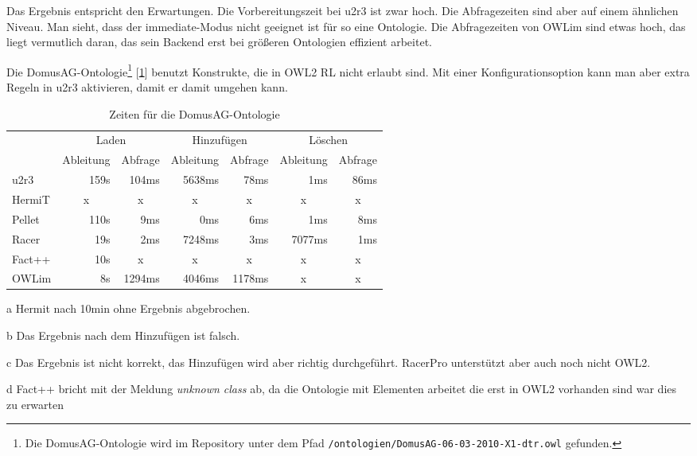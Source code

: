 Das Ergebnis entspricht den Erwartungen. Die Vorbereitungszeit bei u2r3 ist zwar hoch. Die Abfragezeiten sind aber auf einem ähnlichen Niveau.
Man sieht, dass der immediate-Modus nicht geeignet ist für so eine Ontologie. Die Abfragezeiten von OWLim sind etwas hoch, das liegt vermutlich daran, das sein Backend erst bei größeren Ontologien effizient arbeitet.

Die DomusAG-Ontologie\footnote{Die DomusAG-Ontologie wird im Repository unter dem Pfad \texttt{/ontologien/DomusAG-06-03-2010-X1-dtr.owl} gefunden.} [\ref{table-time-domusag}] benutzt Konstrukte, die in OWL2 RL nicht erlaubt sind. Mit einer Konfigurationsoption kann man aber extra Regeln in u2r3 aktivieren, damit er damit umgehen kann.
\begin{table}[htbp]
\caption{Zeiten für die DomusAG-Ontologie}
\label{table-time-domusag}
\begin{center}
\begin{threeparttable}
\begin{tabular}{l|r|r|r|r|r|r|}
\cline{2-7}
 & \multicolumn{2}{|c|}{Laden} & \multicolumn{2}{|c|}{Hinzufügen} & \multicolumn{2}{|c|}{Löschen} \\
\cline{2-7}
 & \multicolumn{1}{|c|}{Ableitung} & \multicolumn{1}{|c|}{Abfrage} & \multicolumn{1}{|c|}{Ableitung} & \multicolumn{1}{|c|}{Abfrage} & \multicolumn{1}{|c|}{Ableitung} & \multicolumn{1}{|c|}{Abfrage} \\
\hline
\multicolumn{1}{|l|}{u2r3} & 159s & 104ms & 5638ms & 78ms & 1ms & 86ms \\ \hline
\multicolumn{1}{|l|}{HermiT\tnote{a}} & \multicolumn{1}{c|}{x} & \multicolumn{1}{c|}{x} & \multicolumn{1}{c|}{x} & \multicolumn{1}{c|}{x} & \multicolumn{1}{c|}{x} & \multicolumn{1}{c|}{x} \\ \hline
\multicolumn{1}{|l|}{Pellet\tnote{b}} & 110s & 9ms & 0ms & 6ms & 1ms & 8ms \\ \hline
\multicolumn{1}{|l|}{Racer\tnote{c}} & 19s & 2ms & 7248ms & 3ms & 7077ms & 1ms \\ \hline
\multicolumn{1}{|l|}{Fact++\tnote{d}} & 10s & \multicolumn{1}{c|}{x} & \multicolumn{1}{c|}{x} & \multicolumn{1}{c|}{x} & \multicolumn{1}{c|}{x} & \multicolumn{1}{c|}{x} \\ \hline
\multicolumn{1}{|l|}{OWLim} & 8s & 1294ms & 4046ms & 1178ms & \multicolumn{1}{c|}{x} & \multicolumn{1}{c|}{x} \\ \hline
\end{tabular}
\begin{tablenotes}
	\item[a] Hermit nach 10min ohne Ergebnis abgebrochen.
	\item[b] Das Ergebnis nach dem Hinzufügen ist falsch.
	\item[c] Das Ergebnis ist nicht korrekt, das Hinzufügen wird aber richtig durchgeführt. RacerPro unterstützt aber auch noch nicht OWL2.
	\item[d] Fact++ bricht mit der Meldung \emph{unknown class} ab, da die Ontologie mit Elementen arbeitet die erst in OWL2 vorhanden sind war dies zu erwarten
\end{tablenotes}
\end{threeparttable}
\end{center}
\end{table}
